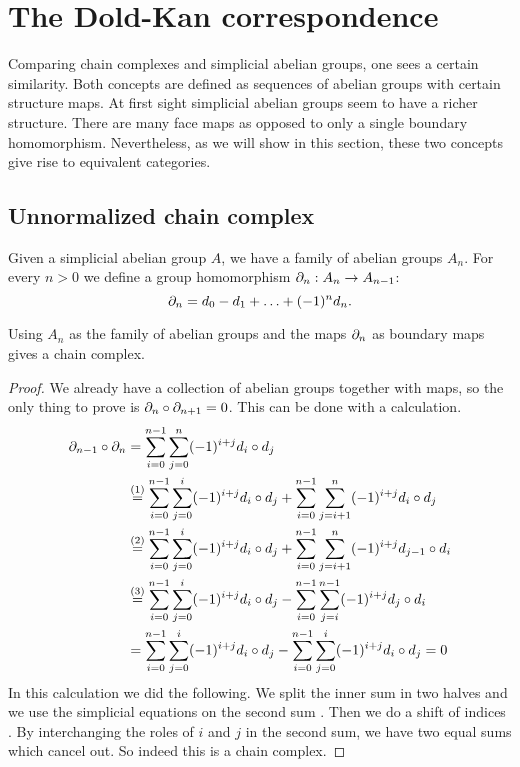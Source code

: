 \section{The Dold-Kan correspondence}
\label{sec:Constructions}

Comparing chain complexes and simplicial abelian groups, one sees a certain similarity. Both concepts are defined as sequences of abelian groups with certain structure maps. At first sight simplicial abelian groups seem to have a richer structure. There are many face maps as opposed to only a single boundary homomorphism. Nevertheless, as we will show in this section, these two concepts give rise to equivalent categories.

\subsection{Unnormalized chain complex}
Given a simplicial abelian group $A$, we have a family of abelian groups $A_n$. For every $n>0$ we define a group homomorphism $\partial_n : A_n \to A_{n-1}$:
$$\partial_n = d_0 - d_1 + \ldots + (-1)^n d_n.$$
\begin{lemma}
	Using $A_n$ as the family of abelian groups and the maps $\partial_n$ as boundary maps gives a chain complex.
\end{lemma}
\begin{proof}
	We already have a collection of abelian groups together with maps, so the only thing to prove is $\partial_n \circ \partial_{n+1} = 0$. This can be done with a calculation.
	\begin{align*}
		\partial_{n-1} \circ \partial_n &= \sum_{i=0}^{n-1}  \sum_{j=0}^{n} (-1)^{i+j} d_i \circ d_j \\
			&\stackrel{(1)}{=} \sum_{i=0}^{n-1} \sum_{j=0}^{i} (-1)^{i+j} d_i \circ d_j + \sum_{i=0}^{n-1} \sum_{j=i+1}^{n} (-1)^{i+j} d_i \circ d_j \\
			&\stackrel{(2)}{=} \sum_{i=0}^{n-1} \sum_{j=0}^{i} (-1)^{i+j} d_i \circ d_j + \sum_{i=0}^{n-1} \sum_{j=i+1}^{n} (-1)^{i+j} d_{j-1} \circ d_i \\
			&\stackrel{(3)}{=} \sum_{i=0}^{n-1} \sum_{j=0}^{i} (-1)^{i+j} d_i \circ d_j - \sum_{i=0}^{n-1} \sum_{j=i}^{n-1} (-1)^{i+j} d_j \circ d_i \\
			&= \sum_{i=0}^{n-1} \sum_{j=0}^{i} (-1)^{i+j} d_i \circ d_j - \sum_{i=0}^{n-1} \sum_{j=0}^{i} (-1)^{i+j} d_i \circ d_j = 0
	\end{align*}
	In this calculation we did the following. We split the inner sum in two halves  and we use the simplicial equations on the second sum . Then we do a shift of indices . By interchanging the roles of $i$ and $j$ in the second sum, we have two equal sums which cancel out. So indeed this is a chain complex.
\end{proof}

